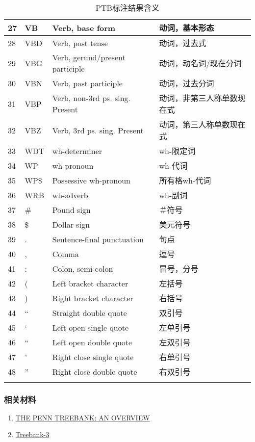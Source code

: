 \begin{longtable}{| p{.05\linewidth} | p{.05\linewidth} | p{.35\linewidth} | p{.30\linewidth} |}
27 & VB & Verb, base form & 动词，基本形态 \\ \hline
28 & VBD & Verb, past tense & 动词，过去式 \\ \hline
29 & VBG & Verb, gerund/present participle & 动词，动名词/现在分词 \\ \hline
30 & VBN & Verb, past participle & 动词，过去分词 \\ \hline
31 & VBP & Verb, non-3rd ps. sing. Present & 动词，非第三人称单数现在式 \\ \hline
32 & VBZ & Verb, 3rd ps. sing. Present & 动词，第三人称单数现在式 \\ \hline
33 & WDT & wh-determiner & wh-限定词 \\ \hline
34 & WP & wh-pronoun & wh-代词 \\ \hline
35 & WP\$ & Possessive wh-pronoun & 所有格wh-代词 \\ \hline
36 & WRB & wh-adverb & wh-副词 \\ \hline
37 & \# & Pound sign & ＃符号 \\ \hline
38 & \$ & Dollar sign & 美元符号 \\ \hline
39 & . & Sentence-final punctuation & 句点 \\ \hline
40 & , & Comma & 逗号 \\ \hline
41 & : & Colon, semi-colon & 冒号，分号 \\ \hline
42 & ( & Left bracket character & 左括号 \\ \hline
43 & ) & Right bracket character & 右括号 \\ \hline
44 & “ & Straight double quote & 双引号 \\ \hline
45 & ‘ & Left open single quote & 左单引号 \\ \hline
46 & “ & Left open double quote & 左双引号 \\ \hline
47 & ’ & Right close single quote & 右单引号 \\ \hline
48 & ” & Right close double quote & 右双引号 \\ \hline
\caption{PTB标注结果含义}
\label{table:ptb_label}
\centering
\end{longtable}

\subsubsection{相关材料}
\begin{enumerate}
\item \href{https://pdfs.semanticscholar.org/182c/4a4074e8577c7ba5cbbc52249e41270c8d64.pdf}{THE PENN TREEBANK: AN OVERVIEW}
\item \href{https://catalog.ldc.upenn.edu/ldc99t42}{Treebank-3}
\end{enumerate}


